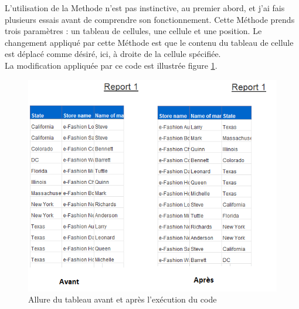 L'utilisation de la \gls{Methode}  n'est pas instinctive, au premier abord, et j'ai fais plusieurs essais avant de comprendre son fonctionnement. Cette M\'{e}thode prends trois param\`{e}tres : un tableau de cellules, une cellule et une position. Le changement appliqu\'{e} par cette M\'{e}thode est que le contenu du tableau de cellule est d\'{e}plac\'{e} comme d\'{e}sir\'{e}, ici, \`{a} droite de la cellule sp\'{e}cifi\'{e}e.\\
La modification appliqu\'{e}e par ce code est illustr\'{e}e figure \ref{figure:dropcells}.\\

\begin{figure}[!h]
  \centering
      \includegraphics{images/dropcells.png}
  \caption{Allure du tableau avant et apr\`{e}s l'ex\'{e}cution du code}
	\label{figure:dropcells}
\end{figure}


\subsection{}




